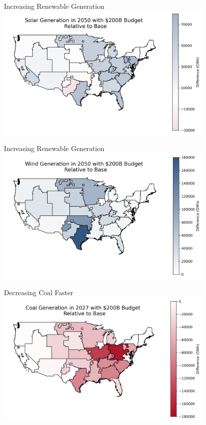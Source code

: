 \documentclass{beamer}
\begin{document}
\begin{frame}{Increasing Renewable Generation}
    \centering
    \includegraphics[width=0.8\textwidth]{Figures/EndogenousPaper/solar_generation_map.png}
\end{frame}


\begin{frame}{Increasing Renewable Generation}
    \centering
    \includegraphics[width=0.8\textwidth]{Figures/EndogenousPaper/wind_generation_map.png}
\end{frame}

\begin{frame}{Decreasing Coal Faster}
    \centering
    \includegraphics[width=0.8\textwidth]{Figures/EndogenousPaper/coal_generation_map_2027_200B.png}
\end{frame}
\end{document}

